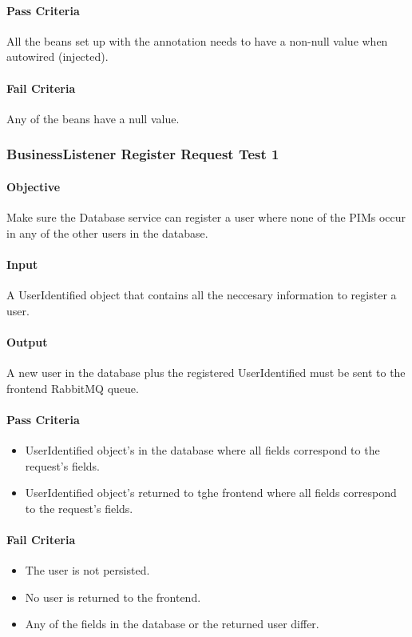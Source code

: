 \documentclass[hidelinks,english]{article}
\begin{document}
				\paragraph{Pass Criteria} All the beans set up with the \emph{\@Bean} annotation needs to have a non-null value when autowired (injected).
				\paragraph{Fail Criteria} Any of the beans have a null value.
		
			\subsubsection{BusinessListener Register Request Test 1}\label{databasebusinesslistenerregistertest1}
				\paragraph{Objective} Make sure the Database service can register a user where none of the PIMs occur in any of the other users in the database.
				\paragraph{Input} A UserIdentified object that contains all the neccesary information to register a user.
				\paragraph{Output} A new user in the database plus the registered UserIdentified must be sent to the frontend RabbitMQ queue.
				\paragraph{Pass Criteria}
				\begin{itemize}
					\item UserIdentified object's in the database where all fields correspond to the request's fields.
					\item UserIdentified object's returned to tghe frontend where all fields correspond to the request's fields.
				\end{itemize}
				\paragraph{Fail Criteria}
				\begin{itemize}
					\item The user is not persisted.
					\item No user is returned to the frontend.
					\item Any of the fields in the database or the returned user differ.
				\end{itemize}
				
\end{document}
